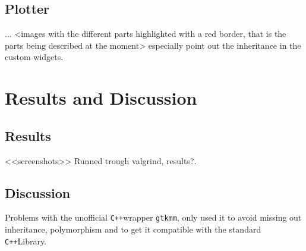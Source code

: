 \documentclass[a4paper,11pt]{kth-mag}
\newcommand{\Cpp}{\texttt{C++}}
\newcommand{\Gtkmm}{\texttt{gtkmm}}
\begin{document}
\section{Plotter}
...
<images with the different parts highlighted with a red border, that is the parts being described at the moment>
especially point out the inheritance in the custom widgets.

\chapter{Results and Discussion}

\section{Results}
<<screenshots>>
Runned trough valgrind, results?.

\section{Discussion}
Problems with the unofficial \Cpp wrapper \Gtkmm, only used it to avoid missing out inheritance, polymorphism and to get it compatible with the standard \Cpp Library. 
 
\end{document}
